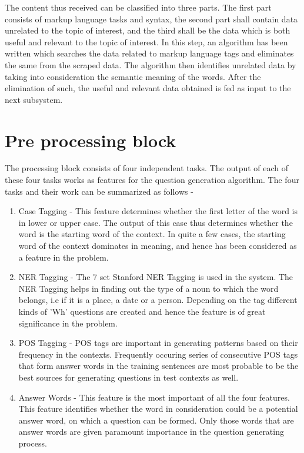 The content thus received can be classified into three parts. The first
part consists of markup language tasks and syntax, the second part shall contain
data unrelated to the topic of interest, and the third shall be the data which
is both useful and relevant to the topic of interest. In this step, an algorithm has been written which searches the data related to markup language tags and eliminates the same from the scraped data. The algorithm then identifies unrelated data by taking into consideration the semantic meaning of the words. After the elimination of such, the useful and relevant data obtained is fed as input to the next subsystem. 

\section{Pre processing block}

The processing block consists of four independent tasks.
The output of each of these four tasks works as features for the question
generation algorithm. The four tasks and their work can be summarized as follows -

\begin{enumerate}

\item Case Tagging - This feature determines whether the first
letter of the word is in lower or upper case. The output of this case thus
determines whether the word is the starting word of the context. In quite a few
cases, the starting word of the context dominates in meaning, and hence has been
considered as a feature in the problem.

\item NER Tagging - The 7 set Stanford NER Tagging is used in the system. The
NER Tagging helps in finding out the type of a noun to which the word belongs, i.e if it is a place, a
date or a person. Depending on the tag different kinds of 'Wh' questions are created and hence
the feature is of great significance in the problem.

\item POS Tagging - POS tags are important in generating patterns based on their
frequency in the contexts. Frequently occuring series of consecutive POS tags
that form answer words in the training sentences are most probable to be the
best sources for generating questions in test contexts as well.

\item Answer Words - This feature is the most important of all the four
features. This feature identifies whether the word in consideration could be a potential answer word, on which a question can be formed. Only those words that are answer
words are given paramount importance in the question generating process.

\end{enumerate}


